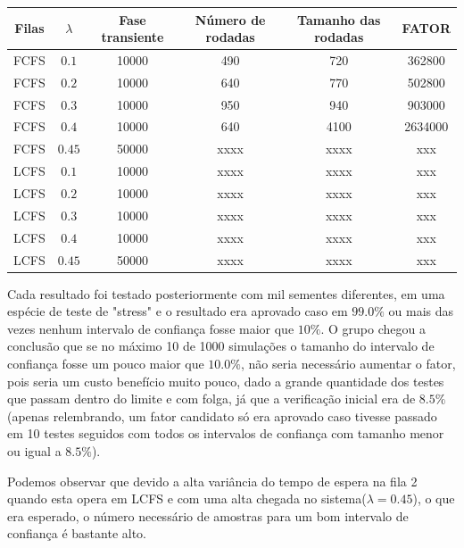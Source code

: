 \documentclass[a4paper,10pt]{article}
\begin{document}
\begin{center}
\begin{tabular} { | c | c | c | c | c | c | }
    \hline
    Filas & $\lambda$  & Fase transiente  & Número de rodadas & Tamanho das rodadas  & FATOR \\ \hline
    FCFS     & $0.1$   & 10000 & 490     & 720      & 362800       \\ \hline
    FCFS     & $0.2$   & 10000 & 640     & 770      & 502800       \\ \hline
    FCFS     & $0.3$   & 10000 & 950     & 940      & 903000       \\ \hline
    FCFS     & $0.4$   & 10000 & 640     & 4100    & 2634000     \\ \hline
    FCFS     & $0.45$ & 50000 & xxxx   & xxxx    & xxx             \\ \hline
    LCFS     & $0.1$   & 10000 & xxxx   & xxxx    & xxx             \\ \hline
    LCFS     & $0.2$   & 10000 & xxxx   & xxxx    & xxx             \\ \hline
    LCFS     & $0.3$   & 10000 & xxxx   & xxxx    & xxx             \\ \hline
    LCFS     & $0.4$   & 10000 & xxxx   & xxxx    & xxx             \\ \hline
    LCFS     & $0.45$ & 50000 & xxxx   & xxxx    & xxx             \\ \hline
\end{tabular}
\end{center}

Cada resultado foi testado posteriormente com mil sementes diferentes, em uma espécie de teste de "stress" e o resultado era aprovado caso em $99.0\%$ ou mais das vezes nenhum intervalo de confiança fosse maior que $10\%$. O grupo chegou a conclusão que se no máximo 10 de 1000 simulações o tamanho do intervalo de confiança fosse um pouco maior que $10.0\%$, não seria necessário aumentar o fator, pois seria um custo benefício muito pouco, dado a grande quantidade dos testes que passam dentro do limite e com folga, já que a verificação inicial era de $8.5\%$ (apenas relembrando, um fator candidato só era aprovado caso tivesse passado em 10 testes seguidos com todos os intervalos de confiança com tamanho menor ou igual a $8.5\%$).

Podemos observar que devido a alta variância do tempo de espera na fila 2 quando esta opera em LCFS e com uma alta chegada no sistema($\lambda = 0.45$), o que era esperado, o número necessário de amostras para um bom intervalo de confiança é bastante alto.
\end{document}

